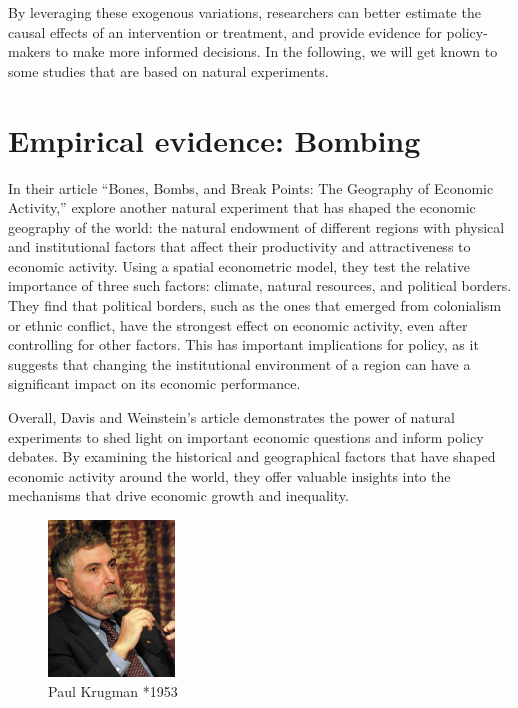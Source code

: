 \documentclass[
  12pt,
  oneside]{book}
\theoremstyle{definition}
\theoremstyle{definition}
\theoremstyle{definition}
\theoremstyle{definition}
\theoremstyle{remark}
\begin{document}
By leveraging these exogenous variations, researchers can better estimate the causal effects of an intervention or treatment, and provide evidence for policy-makers to make more informed decisions. In the following, we will get known to some studies that are based on natural experiments.

\hypertarget{empirical-evidence-bombing}{%
\section{Empirical evidence: Bombing}\label{empirical-evidence-bombing}}

In their article ``Bones, Bombs, and Break Points: The Geography of Economic Activity,'' \citet{Davis2002Bones} explore another natural experiment that has shaped the economic geography of the world: the natural endowment of different regions with physical and institutional factors that affect their productivity and attractiveness to economic activity. Using a spatial econometric model, they test the relative importance of three such factors: climate, natural resources, and political borders. They find that political borders, such as the ones that emerged from colonialism or ethnic conflict, have the strongest effect on economic activity, even after controlling for other factors. This has important implications for policy, as it suggests that changing the institutional environment of a region can have a significant impact on its economic performance.

Overall, Davis and Weinstein's article demonstrates the power of natural experiments to shed light on important economic questions and inform policy debates. By examining the historical and geographical factors that have shaped economic activity around the world, they offer valuable insights into the mechanisms that drive economic growth and inequality.

\begin{figure}
\centering
\includegraphics[width=0.3\textwidth,height=\textheight]{fig/krugman.jpeg}
\caption[\label{fig:krugman} Paul Krugman *1953]{\label{fig:krugman} Paul Krugman *1953\footnotemark{}}
\end{figure}
\end{document}
